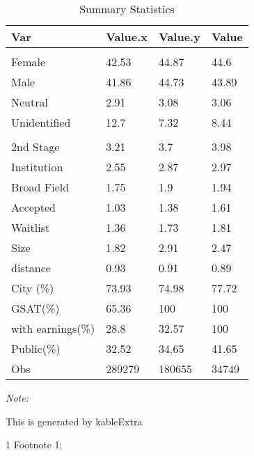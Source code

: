 \begin{table}
\centering
\caption{Summary Statistics}
\centering
\begin{threeparttable}
\begin{tabular}[t]{llll}
\toprule
Var & Value.x & Value.y & Value\\
\midrule
\addlinespace[0.3em]
\multicolumn{4}{l}{\textit{\textbf{Gender (\%)}}}\\
\hspace{1em}Female & 42.53 & 44.87 & 44.6\\
\hspace{1em}Male & 41.86 & 44.73 & 43.89\\
\hspace{1em}Neutral & 2.91 & 3.08 & 3.06\\
\hspace{1em}Unidentified & 12.7 & 7.32 & 8.44\\
\addlinespace[0.3em]
\multicolumn{4}{l}{\textit{\textbf{Personal Application}}}\\
\hspace{1em}2nd Stage & 3.21 & 3.7 & 3.98\\
\hspace{1em}Institution & 2.55 & 2.87 & 2.97\\
\hspace{1em}Broad Field & 1.75 & 1.9 & 1.94\\
\hspace{1em}Accepted & 1.03 & 1.38 & 1.61\\
\hspace{1em}Waitlist & 1.36 & 1.73 & 1.81\\
Size & 1.82 & 2.91 & 2.47\\
distance & 0.93 & 0.91 & 0.89\\
City (\%) & 73.93 & 74.98 & 77.72\\
GSAT(\%) & 65.36 & 100 & 100\\
with earnings(\%) & 28.8 & 32.57 & 100\\
Public(\%) & 32.52 & 34.65 & 41.65\\
Obs & 289279 & 180655 & 34749\\
\bottomrule
\end{tabular}
\begin{tablenotes}
\item \textit{Note: } 
\item This is generated by kableExtra
\item[1] Footnote 1; 
\end{tablenotes}
\end{threeparttable}
\end{table}
